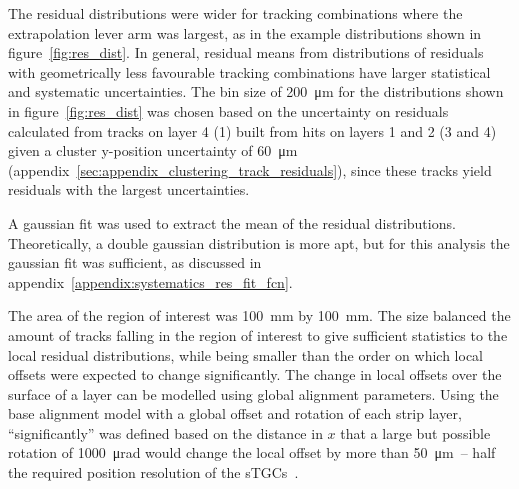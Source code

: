 The residual distributions were wider for tracking combinations where the extrapolation lever arm was largest, as in the example distributions shown in figure~\ref{fig:res_dist}. In general, residual means from distributions of residuals with geometrically less favourable tracking combinations have larger statistical and systematic uncertainties. The bin size of \SI{200}{\micro\meter} for the distributions shown in figure~\ref{fig:res_dist} was chosen based on the uncertainty on residuals calculated from tracks on layer 4 (1) built from hits on layers 1 and 2 (3 and 4) given a cluster y-position uncertainty of \SI{60}{\micro\meter} (appendix~\ref{sec:appendix_clustering_track_residuals}), since these tracks yield residuals with the largest uncertainties.

A gaussian fit was used to extract the mean of the residual distributions. Theoretically, a double gaussian distribution is more apt, but for this analysis the gaussian fit was sufficient, as discussed in appendix~\ref{appendix:systematics_res_fit_fcn}.

The area of the region of interest was \SI{100}{\milli\meter} by \SI{100}{\milli\meter}. The size balanced the amount of tracks falling in the region of interest to give sufficient statistics to the local residual distributions, while being smaller than the order on which local offsets were expected to change significantly. The change in local offsets over the surface of a layer can be modelled using global alignment parameters. Using the base alignment model with a global offset and rotation of each strip layer, ``significantly'' was defined based on the distance in $x$ that a large but possible rotation of \SI{1000}{\micro\radian} would change the local offset by more than \SI{50}{\micro\meter}~-- half the required position resolution of the sTGCs~\cite{nsw_tdr}.


